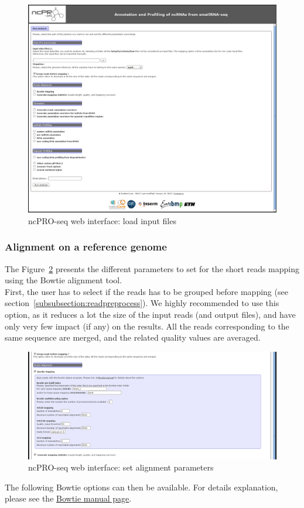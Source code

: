 \documentclass[12pt]{article}
\def \ncpip{ncPRO-seq}
\begin{document}
\begin{figure}[!h]
\includegraphics[width=\textwidth]{web_1.png}
\caption{\ncpip{} web interface: load input files}
\label{fig:web1}
\end{figure} 
\subsubsection{Alignment on a reference genome}
The Figure~\ref{fig:web2} presents the different parameters to set for the short reads mapping using the Bowtie alignment tool.\\
First, the user has to select if the reads has to be grouped before mapping (see section~\ref{subsubsection:readpreprocess}). We highly recommended to use this option, as it reduces a lot the size of the input reads (and output files), and have only very few impact (if any) on the results. All the reads corresponding to the same sequence are merged, and the related quality values are averaged.\\
\begin{figure}[!h]
\includegraphics[width=\textwidth]{web_2.png}
\caption{\ncpip{} web interface: set alignment parameters}
\label{fig:web2}
\end{figure} 
The following Bowtie options can then be available. For details explanation, please see the \href{http://bowtie-bio.sourceforge.net/manual.shtml}{ Bowtie manual page}.
\end{document}

